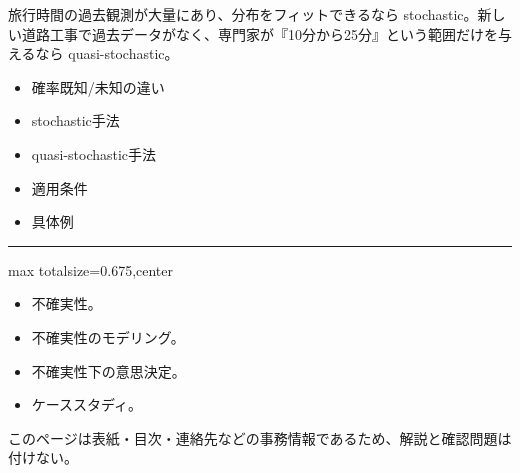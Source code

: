 旅行時間の過去観測が大量にあり、分布をフィットできるなら stochastic。新しい道路工事で過去データがなく、専門家が『10分から25分』という範囲だけを与えるなら quasi-stochastic。\par
{}
\begin{itemize}
\item 確率既知/未知の違い
\item stochastic手法
\item quasi-stochastic手法
\item 適用条件
\item 具体例
\end{itemize}
\vspace{2mm}\hrule\vspace{2mm}

\clearpage
{}
\begin{adjustbox}{max totalsize={\textwidth}{0.675\textheight},center}
\begin{minipage}{\textwidth}\scriptsize
\begin{minipage}[t]{0.485\textwidth}
\begin{itemize}
\item 不確実性。
\item 不確実性のモデリング。
\item 不確実性下の意思決定。
\item ケーススタディ。
\end{itemize}
\end{minipage}\hfill
\begin{minipage}[t]{0.485\textwidth}
{\small このページは表紙・目次・連絡先などの事務情報であるため、解説と確認問題は付けない。}
\end{minipage}
\end{minipage}
\end{adjustbox}

